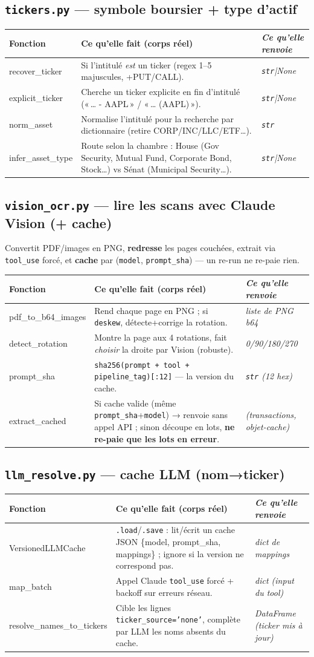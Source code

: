\documentclass[11pt,a4paper]{article}
\newcommand{\co}[1]{\texttt{\small #1}}
\newenvironment{fntab}{%
  \par\small
  \begin{longtable}{>{\ttfamily\footnotesize}p{3.0cm} p{9.1cm} >{\itshape\footnotesize}p{3.4cm}}
  \toprule
  \normalfont\bfseries Fonction & \bfseries Ce qu'elle fait (corps réel) & \normalfont\bfseries Ce qu'elle renvoie\\
  \midrule\endhead
}{\bottomrule\end{longtable}\par}
\begin{document}
\subsection{\texttt{tickers.py} — symbole boursier + type d'actif}
\begin{fntab}
recover_ticker & Si l'intitulé \emph{est} un ticker (regex 1–5 majuscules, +PUT/CALL). & \co{str}|None \\
explicit_ticker & Cherche un ticker explicite en fin d'intitulé («\,… - AAPL\,» / «\,… (AAPL)\,»). & \co{str}|None \\
norm_asset & Normalise l'intitulé pour la recherche par dictionnaire (retire CORP/INC/LLC/ETF…). & \co{str} \\
infer_asset_type & Route selon la chambre : House (Gov Security, Mutual Fund, Corporate Bond, Stock…) vs Sénat (Municipal Security…). & \co{str}|None \\
\end{fntab}

\subsection{\texttt{vision_ocr.py} — lire les scans avec Claude Vision (+ cache)}
Convertit PDF/images en PNG, \textbf{redresse} les pages couchées, extrait via \co{tool_use} forcé, et
\textbf{cache} par (\co{model}, \co{prompt_sha}) — un re-run ne re-paie rien.
\begin{fntab}
pdf_to_b64_images & Rend chaque page en PNG ; si \co{deskew}, détecte+corrige la rotation. & liste de PNG b64 \\
detect_rotation & Montre la page aux 4 rotations, fait \emph{choisir} la droite par Vision (robuste). & 0/90/180/270 \\
prompt_sha & \co{sha256(prompt + tool + pipeline_tag)[:12]} — la version du cache. & \co{str} (12 hex) \\
extract_cached & Si cache valide (même \co{prompt_sha}+\co{model}) → renvoie sans appel API ; sinon découpe en lots, \textbf{ne re-paie que les lots en erreur}. & (transactions, objet-cache) \\
\end{fntab}

\subsection{\texttt{llm_resolve.py} — cache LLM (nom→ticker)}
\begin{fntab}
VersionedLLMCache & \co{.load}/\co{.save} : lit/écrit un cache JSON \{model, prompt\_sha, mappings\} ; ignore si la version ne correspond pas. & dict de mappings \\
map_batch & Appel Claude \co{tool_use} forcé + backoff sur erreurs réseau. & dict (input du tool) \\
resolve_names_to_tickers & Cible les lignes \co{ticker_source='none'}, complète par LLM les noms absents du cache. & DataFrame (ticker mis à jour) \\
\end{fntab}
\end{document}
